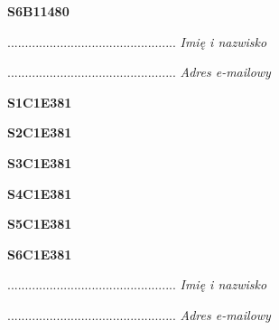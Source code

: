 \begin{turn}{90}\huge \textbf{S6B11480}\end{turn}

\begin{turn}{90}\begin{minipage}{\linewidth} \vspace{20mm} ................................................  \textit{Imię i nazwisko}\end{minipage}\end{turn}

\begin{turn}{90}\begin{minipage}{\linewidth} \vspace{20mm} ................................................  \textit{Adres e-mailowy}\end{minipage}\end{turn}

\begin{turn}{90}\huge \textbf{S1C1E381}\end{turn}

\begin{turn}{90}\huge \textbf{S2C1E381}\end{turn}

\begin{turn}{90}\huge \textbf{S3C1E381}\end{turn}

\begin{turn}{90}\huge \textbf{S4C1E381}\end{turn}

\begin{turn}{90}\huge \textbf{S5C1E381}\end{turn}

\begin{turn}{90}\huge \textbf{S6C1E381}\end{turn}

\begin{turn}{90}\begin{minipage}{\linewidth} \vspace{20mm} ................................................  \textit{Imię i nazwisko}\end{minipage}\end{turn}

\begin{turn}{90}\begin{minipage}{\linewidth} \vspace{20mm} ................................................  \textit{Adres e-mailowy}\end{minipage}\end{turn}

